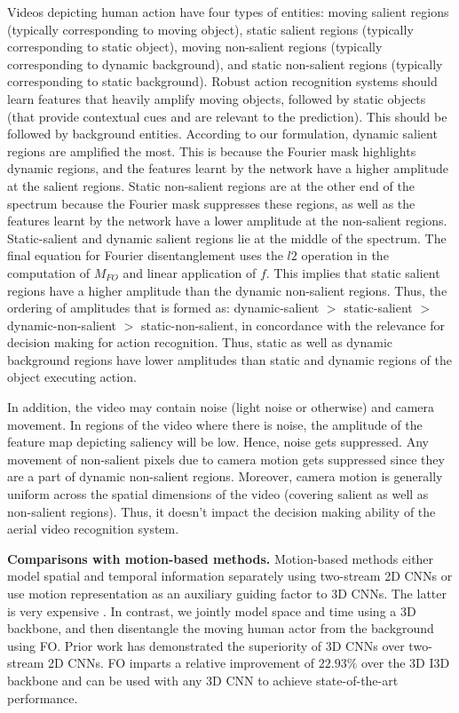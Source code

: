 \documentclass[runningheads]{llncs}
\begin{document}
Videos depicting human action have four types of entities: moving salient regions (typically corresponding to moving object), static salient regions (typically corresponding to static object), moving non-salient regions (typically corresponding to dynamic background), and static non-salient regions (typically corresponding to static background). Robust action recognition systems should learn features that heavily amplify moving objects, followed by static objects (that provide contextual cues and are relevant to the prediction). This should be followed by background entities. According to our formulation, dynamic salient regions are amplified the most. This is because the Fourier mask highlights dynamic regions, and the features learnt by the network have a higher amplitude at the salient regions. Static non-salient regions are at the other end of the spectrum because the Fourier mask suppresses these regions, as well as the features learnt by the network have a lower amplitude at the non-salient regions. Static-salient and dynamic salient regions lie at the middle of the spectrum. The final equation for Fourier disentanglement uses the $l2$ operation in the computation of $M_{FO}$ and linear application of $f$. This implies that static salient regions have a higher amplitude than the dynamic non-salient regions. Thus, the ordering of amplitudes that is formed as: dynamic-salient $>$ static-salient $>$ dynamic-non-salient $>$ static-non-salient, in concordance with the relevance for decision making for action recognition. Thus, static as well as dynamic background regions have lower amplitudes than static and dynamic regions of the object executing action. 

In addition, the video may contain noise (light noise or otherwise) and camera movement. In regions of the video where there is noise, the amplitude of the feature map depicting saliency will be low. Hence, noise gets suppressed. Any movement of non-salient pixels due to camera motion gets suppressed since they are a part of dynamic non-salient regions. Moreover, camera motion is generally uniform across the spatial dimensions of the video (covering salient as well as non-salient regions). Thus, it doesn't impact the decision making ability of the aerial video recognition system.  

\noindent \textbf{Comparisons with motion-based methods.} Motion-based methods either model spatial and temporal information separately using two-stream 2D CNNs \cite{lee2018motion} or use motion representation as an auxiliary guiding factor to 3D CNNs. The latter is very expensive \cite{piergiovanni2019representation}. In contrast, we jointly model space and time using a 3D backbone, and then disentangle the moving human actor from the background using FO. Prior work has demonstrated the superiority \cite{feichtenhofer2019slowfast,feichtenhofer2020x3d} of 3D CNNs over two-stream 2D CNNs. FO imparts a relative improvement of $22.93\%$ over the 3D I3D backbone and can be used with any 3D CNN to achieve state-of-the-art performance.
\end{document}
